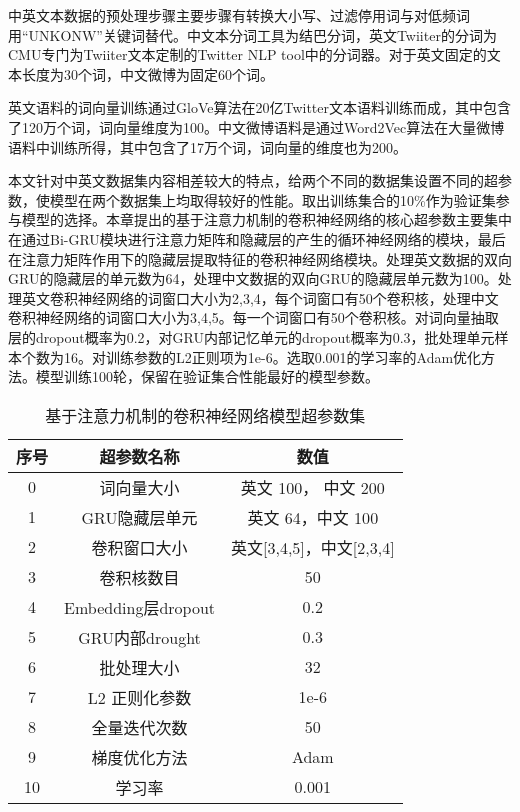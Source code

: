 中英文本数据的预处理步骤主要步骤有转换大小写、过滤停用词与对低频词用“UNKONW”关键词替代。中文本分词工具为结巴分词，英文Twiiter的分词为CMU专门为Twiiter文本定制的Twitter NLP tool中的分词器。对于英文固定的文本长度为30个词，中文微博为固定60个词。

英文语料的词向量训练通过GloVe算法在20亿Twitter文本语料训练而成，其中包含了120万个词，词向量维度为100。中文微博语料是通过Word2Vec算法在大量微博语料中训练所得，其中包含了17万个词，词向量的维度也为200。


本文针对中英文数据集内容相差较大的特点，给两个不同的数据集设置不同的超参数，使模型在两个数据集上均取得较好的性能。取出训练集合的10\%作为验证集参与模型的选择。本章提出的基于注意力机制的卷积神经网络的核心超参数主要集中在通过Bi-GRU模块进行注意力矩阵和隐藏层的产生的循环神经网络的模块，最后在注意力矩阵作用下的隐藏层提取特征的卷积神经网络模块。处理英文数据的双向GRU的隐藏层的单元数为64，处理中文数据的双向GRU的隐藏层单元数为100。处理英文卷积神经网络的词窗口大小为2,3,4，每个词窗口有50个卷积核，处理中文卷积神经网络的词窗口大小为3,4,5。每一个词窗口有50个卷积核。对词向量抽取层的dropout概率为0.2，对GRU内部记忆单元的dropout概率为0.3，批处理单元样本个数为16。对训练参数的L2正则项为1e-6。选取0.001的学习率的Adam优化方法。模型训练100轮，保留在验证集合性能最好的模型参数。

\begin{table}[htbp]
	\caption[param]{基于注意力机制的卷积神经网络模型超参数集}
	\label{param}
	\vspace{0.5em}\centering\wuhao
	\begin{tabular}{ccc}
		\toprule[1.5pt]
		序号& 超参数名称 &数值\\
		\midrule[1pt]
		0 &词向量大小& 英文 100， 中文 200\\
		1 &GRU隐藏层单元& 英文 64，中文 100\\
		2 &卷积窗口大小&英文[3,4,5]，中文[2,3,4]\\
		3 &卷积核数目& 50\\
		4 &Embedding层dropout& 0.2\\
		5 &GRU内部drought& 0.3\\
		6 &批处理大小& 32\\
		7 &L2 正则化参数 &1e-6\\
		8 &全量迭代次数& 50\\
		9 &梯度优化方法& Adam\\
		10 &学习率& 0.001\\
		\bottomrule[1.5pt]
	\end{tabular}
\end{table}

